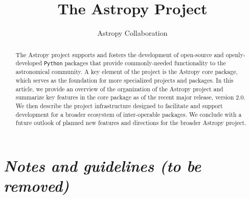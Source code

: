 \documentclass[modern]{aastex61}
\newcommand{\package}[1]{\texttt{#1}\xspace}
\newcommand{\python}{\package{Python}}
\newcommand{\astropy}{Astropy\xspace}
\begin{document}
\draft{\today}

\title{The Astropy Project}


\author{Astropy Collaboration}

\begin{abstract}
The \astropy project supports and fosters the development of open-source and openly-developed
\python packages that provide commonly-needed functionality to the astronomical
community.
A key element of the project is the \astropy core package, which serves as the
foundation for more specialized projects and packages.
In this article, we provide an overview of the organization of the \astropy
project and summarize key features in the core package as of the recent major
release, version 2.0.
We then describe the project infrastructure designed to facilitate and support
development for a broader ecosystem of inter-operable packages.
We conclude with a future outlook of planned new features and directions for the
broader \astropy project.
\end{abstract}


\section*{\textit{Notes and guidelines (to be removed)}}
\end{document}
